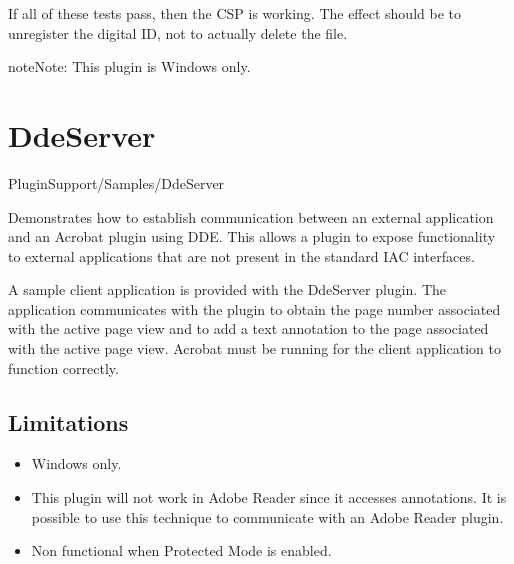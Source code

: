 \documentclass[letterpaper,12pt,english,openany,oneside]{sphinxmanual}
\begin{document}
If all of these tests pass, then the CSP is working. The effect should be to un\sphinxhyphen{}register the digital ID, not to actually delete the file.

\begin{sphinxadmonition}{note}{Note:}
This plugin is Windows only.
\end{sphinxadmonition}


\section{DdeServer}
\label{\detokenize{Samples_Plug_in:ddeserver}}\label{\detokenize{Samples_Plug_in:location-3}}

PluginSupport/Samples/DdeServer

\label{\detokenize{Samples_Plug_in:description-3}}

Demonstrates how to establish communication between an external application and an Acrobat plugin using DDE. This allows a plugin to expose functionality to external applications that are not present in the standard IAC interfaces.

\label{\detokenize{Samples_Plug_in:usage-2}}

A sample client application is provided with the DdeServer plugin. The application communicates with the plugin to obtain the page number associated with the active page view and to add a text annotation to the page associated with the active page view. Acrobat must be running for the client application to function correctly.


\subsection{Limitations}
\label{\detokenize{Samples_Plug_in:limitations}}\begin{itemize}
\item {} 
Windows only.

\item {} 
This plugin will not work in Adobe Reader since it accesses annotations. It is possible to use this technique to communicate with an Adobe Reader plugin.

\item {} 
Non functional when Protected Mode is enabled.

\end{itemize}
\end{document}
